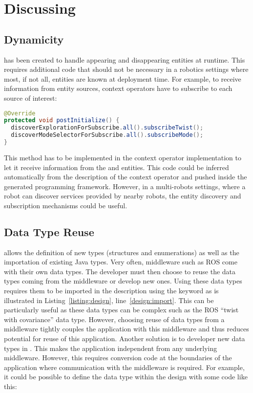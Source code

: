 \section{Discussing}
\label{sec:discussing}

\subsection{\diaspec{} Dynamicity}

\diaspec{} has been created to handle appearing and disappearing
entities at runtime. This requires additional code that should not be
necessary in a robotics settings where most, if not all, entities are
known at deployment time. For example, to receive information from
entity sources, context operators have to subscribe to each source of
interest:

\begin{lstlisting}[language=java]
@Override
protected void postInitialize() {
  discoverExplorationForSubscribe.all().subscribeTwist();
  discoverModeSelectorForSubscribe.all().subscribeMode();
}
\end{lstlisting}

This method has to be implemented in the  context operator
implementation to let it receive information from the 
and  entities. This code could be inferred
automatically from the description of the  context operator
and pushed inside the generated programming framework. However, in a
multi-robots settings, where a robot can discover services provided by
nearby robots, the \diaspec{} entity discovery and subscription
mechanisms could be useful.

\subsection{Data Type Reuse}

\diaspec{} allows the definition of new types (structures and
enumerations) as well as the importation of existing Java types. Very
often, middleware such as ROS come with their own data types. The
developer must then choose to reuse the data types coming from the
middleware or develop new ones. Using these data types requires them
to be imported in the \diaspec{} description using the 
keyword as is illustrated in Listing~\ref{listing:design},
line~\ref{design:import}. This can be particularly useful as these
data types can be complex such as the ROS ``twist with covariance''
data type. However, choosing reuse of data types from a middleware
tightly couples the application with this middleware and thus reduces
potential for reuse of this application. Another solution is to
developer new data types in \diaspec{}. This makes the application
independent from any underlying middleware. However, this requires
conversion code at the boundaries of the application where
communication with the middleware is required. For example, it could
be possible to define the  data type within the design with
some code like this:

